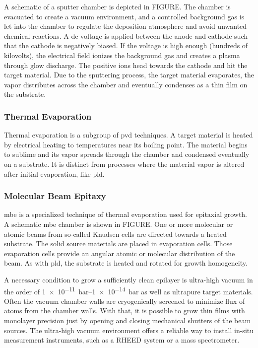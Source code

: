 A schematic of a sputter chamber is depicted in FIGURE.
The chamber is evacuated to create a vacuum environment, and a controlled background gas
is let into the chamber to regulate the deposition atmosphere and avoid unwanted 
chemical reactions.
A dc-voltage is applied between the anode and cathode such that the cathode is 
negatively biased.
If the voltage is high enough (hundreds of kilovolts), the electrical field ionizes
the background gas and creates a plasma through glow discharge. 
The positive ions head towards the cathode and hit the target material.
Due to the sputtering process, the target material evaporates, the vapor distributes 
across the chamber and eventually condenses as a thin film on the substrate. 

\subsubsection{Thermal Evaporation}
Thermal evaporation is a subgroup of \ac{pvd} techniques. 
A target material is heated by electrical heating to temperatures near its boiling 
point.
The material begins to sublime and its vapor spreads through the chamber and condensed 
eventually on a substrate.
It is distinct from processes where the material vapor is altered after initial 
evaporation, like \ac{pld}. 

\subsubsection{Molecular Beam Epitaxy}
\Ac{mbe} is a specialized technique of thermal evaporation used for epitaxial growth.
A schematic \ac{mbe} chamber is shown in FIGURE. 
One or more molecular or atomic beams from so-called Knudsen cells are directed towards 
a heated substrate.
The solid source materials are placed in evaporation cells.
Those evaporation cells provide an angular atomic or molecular distribution of the beam.
As with \ac{pld}, the substrate is heated and rotated for growth homogeneity.

A necessary condition to grow a sufficiently clean epilayer is ultra-high vacuum in the
order of \qtyrange{1e-11}{1e-14}{\bar} as well as ultrapure target materials.
Often the vacuum chamber walls are cryogenically screened to minimize flux of 
atoms from the chamber walls.
With that, it is possible to grow thin films with monolayer precision just by opening 
and closing mechanical shutters of the beam sources. 
The ultra-high vacuum environment offers a reliable way to install in-situ measurement
instruments, such as a RHEED system or a mass spectrometer. 

